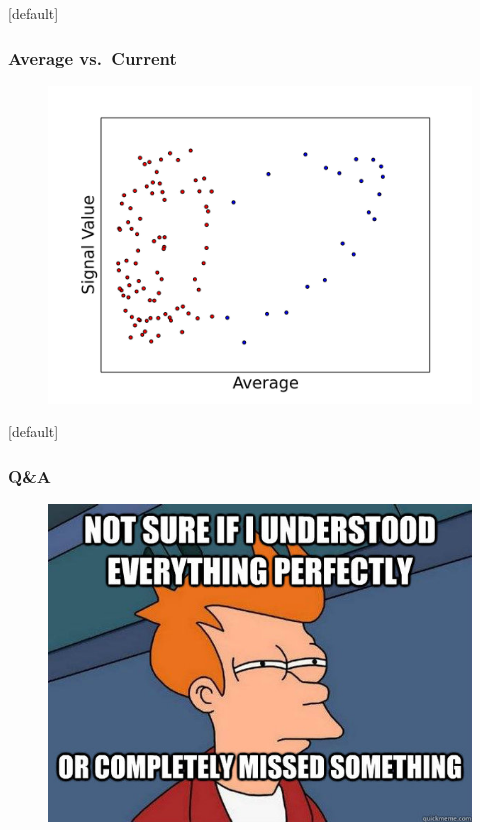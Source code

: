 \documentclass{beamer}
\begin{document}
  {
  \makeatletter
    [default]
    \def\beamer@entrycode{\vspace*{-\headheight}}
  \makeatother
  \begin{frame}
    \frametitle{Average vs.\ Current} 
    \begin{figure}
      \includegraphics[scale=.5]{./gfx/f1f5.png}
    \end{figure}
  \end{frame}
  }

  {
  \makeatletter
    [default]
    \def\beamer@entrycode{\vspace*{-\headheight}}
  \makeatother
  \begin{frame}
    \frametitle{Q\&A}
    \begin{figure}
      \includegraphics[scale=.5]{./gfx/futurama-fry-meme-00020.jpg}
    \end{figure}
  \end{frame}
  }

\end{document}
